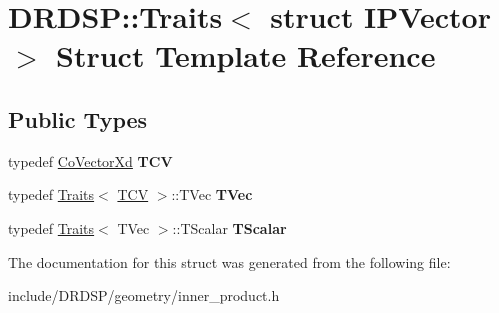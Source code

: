 \hypertarget{struct_d_r_d_s_p_1_1_traits_3_01struct_01_i_p_vector_01_4}{\section{D\-R\-D\-S\-P\-:\-:Traits$<$ struct I\-P\-Vector $>$ Struct Template Reference}
\label{struct_d_r_d_s_p_1_1_traits_3_01struct_01_i_p_vector_01_4}
}
\subsection*{Public Types}
\begin{DoxyCompactItemize}
\item 
\hypertarget{struct_d_r_d_s_p_1_1_traits_3_01struct_01_i_p_vector_01_4_a4cd9c5279190cc8725fef7bc66830a5e}{typedef \hyperlink{struct_d_r_d_s_p_1_1_co_vector_xd}{Co\-Vector\-Xd} {\bfseries T\-C\-V}}\label{struct_d_r_d_s_p_1_1_traits_3_01struct_01_i_p_vector_01_4_a4cd9c5279190cc8725fef7bc66830a5e}

\item 
\hypertarget{struct_d_r_d_s_p_1_1_traits_3_01struct_01_i_p_vector_01_4_a4eba2a5c184d06a8f7e06ae6fe2f2664}{typedef \hyperlink{struct_d_r_d_s_p_1_1_traits}{Traits}$<$ \hyperlink{struct_d_r_d_s_p_1_1_co_vector_xd}{T\-C\-V} $>$\-::T\-Vec {\bfseries T\-Vec}}\label{struct_d_r_d_s_p_1_1_traits_3_01struct_01_i_p_vector_01_4_a4eba2a5c184d06a8f7e06ae6fe2f2664}

\item 
\hypertarget{struct_d_r_d_s_p_1_1_traits_3_01struct_01_i_p_vector_01_4_a3c954ce780dd48092a7bada2aaae8c89}{typedef \hyperlink{struct_d_r_d_s_p_1_1_traits}{Traits}$<$ T\-Vec $>$\-::T\-Scalar {\bfseries T\-Scalar}}\label{struct_d_r_d_s_p_1_1_traits_3_01struct_01_i_p_vector_01_4_a3c954ce780dd48092a7bada2aaae8c89}

\end{DoxyCompactItemize}


The documentation for this struct was generated from the following file\-:\begin{DoxyCompactItemize}
\item 
include/\-D\-R\-D\-S\-P/geometry/inner\-\_\-product.\-h\end{DoxyCompactItemize}
